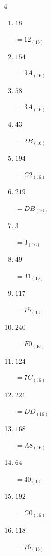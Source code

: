 \begin{multicols}{4}
\begin{enumerate}
        $=2D_{(16)}$

  \item $18$

        $=12_{(16)}$

\columnbreak %

  \item $154$

        $=9A_{(16)}$

  \item $58$

        $=3A_{(16)}$

  \item $43$

        $=2B_{(16)}$

  \item $194$

        $=C2_{(16)}$

  \item $219$

        $=DB_{(16)}$

  \item $3$

        $=3_{(16)}$

  \item $49$

        $=31_{(16)}$

  \item $117$

        $=75_{(16)}$

  \item $240$

        $=F0_{(16)}$

  \item $124$

        $=7C_{(16)}$

  \item $221$

        $=DD_{(16)}$

  \item $168$

        $=A8_{(16)}$

  \item $64$

        $=40_{(16)}$

  \item $192$

        $=C0_{(16)}$

  \item $118$

        $=76_{(16)}$


\end{enumerate}
\end{multicols}
